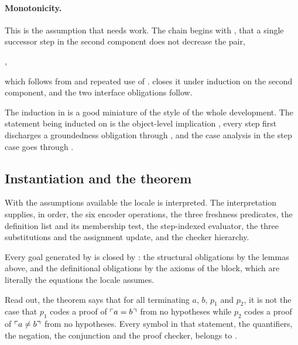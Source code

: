 
\paragraph{Monotonicity.}
This is the assumption that needs work.  The chain begins with
, that a single successor step in the second component does not
decrease the pair,
\begin{center}
,
\end{center}
which follows from  and repeated use of
.   closes it under induction on
the second component, and the two interface obligations follow.


\noindent
The induction in  is a good miniature of the style of the
whole development.  The statement being inducted on is the object-level
implication , every  step
first discharges a groundedness obligation through , and the case
analysis in the step case goes through .

\subsection{Instantiation and the theorem}

With the assumptions available the locale is interpreted.  The interpretation
supplies, in order, the six encoder operations, the three freshness predicates,
the definition list and its membership test, the step-indexed evaluator, the
three substitutions and the assignment update, and the checker hierarchy.


\noindent
Every goal generated by  is closed by : the
structural obligations by the lemmas above, and the definitional obligations by
the \isa{:=} axioms of the  block, which are literally the
equations the locale assumes.


\noindent
Read out, the theorem says that for all terminating $a$, $b$, $p_1$ and $p_2$,
it is not the case that $p_1$ codes a \BGA{} proof of $\ulcorner a = b \urcorner$ from no
hypotheses while $p_2$ codes a \BGA{} proof of $\ulcorner a \neq b \urcorner$ from no
hypotheses.  Every symbol in that statement, the quantifiers, the negation, the
conjunction and the proof checker, belongs to \QGA.
